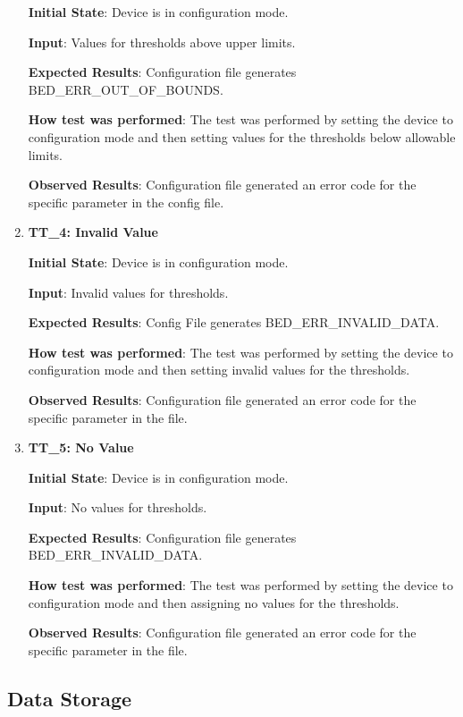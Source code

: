 \documentclass[12pt, titlepage]{article}
\begin{document}
\begin{enumerate}
  \textbf{Initial State}: Device is in configuration mode.

  \textbf{Input}: Values for thresholds above upper limits.

  \textbf{Expected Results}: Configuration file generates BED\_ERR\_OUT\_OF\_BOUNDS.

  \textbf{How test was performed}: The test was performed by setting the device to configuration mode and then setting values for the thresholds below allowable limits.

  \textbf{Observed Results}: Configuration file generated an error code for the specific parameter in the config file.

  \item{\textbf{TT\_4: Invalid Value} \\}\label{TT4}

  \textbf{Initial State}: Device is in configuration mode.

  \textbf{Input}: Invalid values for thresholds.

  \textbf{Expected Results}: Config File generates BED\_ERR\_INVALID\_DATA.

  \textbf{How test was performed}: The test was performed by setting the device to configuration mode and then setting invalid values for the thresholds.

  \textbf{Observed Results}: Configuration file generated an error code for the specific parameter in the file.

  \item{\textbf{TT\_5: No Value} \\}\label{TT5}

  \textbf{Initial State}: Device is in configuration mode.

  \textbf{Input}: No values for thresholds.

  \textbf{Expected Results}: Configuration file generates BED\_ERR\_INVALID\_DATA.

  \textbf{How test was performed}: The test was performed by setting the device to configuration mode and then assigning no values for the thresholds.

  \textbf{Observed Results}: Configuration file generated an error code for the specific parameter in the file.
\end{enumerate}

\subsection{Data Storage}
\end{document}
